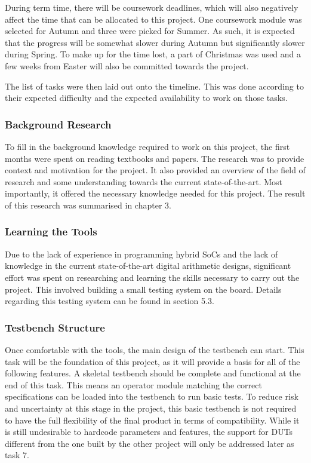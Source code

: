 During term time, there will be coursework deadlines, which will also
negatively affect the time that can be allocated to this project.
One coursework module was selected for Autumn and three were picked for Summer.
As such, it is expected that the progress will be somewhat slower during Autumn
but significantly slower during Spring.
To make up for the time lost, a part of Christmas was used and a few weeks
from Easter will also be committed towards the project.

The list of tasks were then laid out onto the timeline.
This was done according to their expected difficulty and the expected
availability to work on those tasks.

\subsubsection{\textbf{Background Research}}
To fill in the background knowledge required to work on this project, the first
months were spent on reading textbooks and papers.
The research was to provide context and motivation for the project.
It also provided an overview of the field of research and some understanding
towards the current state-of-the-art.
Most importantly, it offered the necessary knowledge needed for this project.
The result of this research was summarised in chapter 3.

\subsubsection{\textbf{Learning the Tools}}
Due to the lack of experience in programming hybrid SoCs and the lack of
knowledge in the current state-of-the-art digital arithmetic designs,
significant effort was spent on researching and learning the skills
necessary to carry out the project.
This involved building a small testing system on the board.
Details regarding this testing system can be found in section 5.3.

\subsubsection{\textbf{Testbench Structure}}
Once comfortable with the tools, the main design of the testbench can start.
This task will be the foundation of this project, as it will provide a basis
for all of the following features.
A skeletal testbench should be complete and functional at the end of this
task.
This means an operator module matching the correct specifications can
be loaded into the testbench to run basic tests.
To reduce risk and uncertainty at this stage in the project, this basic
testbench is not required to have the full flexibility of the final product
in terms of compatibility.
While it is still undesirable to hardcode parameters and features,
the support for DUTs different from the one built by the other project will
only be addressed later as task 7.

